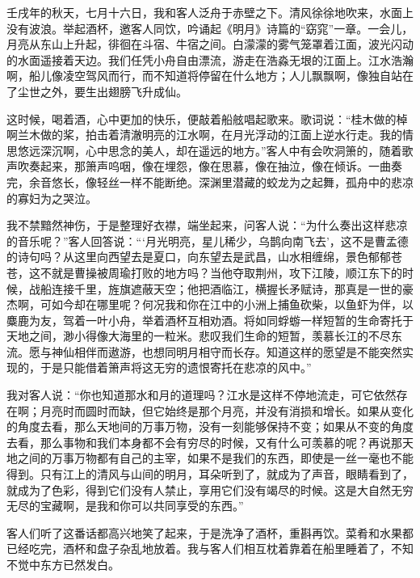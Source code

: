 \documentclass[12pt,UTF-8,openany,a4]{ctexbook}
\begin{document}
\begin{large}\yiwen
    
    壬戌年的秋天，七月十六日，我和客人泛舟于赤壁之下。清风徐徐地吹来，水面上没有波浪。举起酒杯，邀客人同饮，吟诵起《明月》诗篇的“窈窕”一章。一会儿，月亮从东山上升起，徘徊在斗宿、牛宿之间。白濛濛的雾气笼罩着江面，波光闪动的水面遥接着天边。我们任凭小舟自由漂流，游走在浩淼无垠的江面上。江水浩瀚啊，船儿像凌空驾风而行，而不知道将停留在什么地方；人儿飘飘啊，像独自站在了尘世之外，要生出翅膀飞升成仙。
    
    这时候，喝着酒，心中更加的快乐，便敲着船舷唱起歌来。歌词说：“桂木做的棹啊兰木做的桨，拍击着清澈明亮的江水啊，在月光浮动的江面上逆水行走。我的情思悠远深沉啊，心中思念的美人，却在遥远的地方。”客人中有会吹洞箫的，随着歌声吹奏起来，那箫声呜咽，像在埋怨，像在思慕，像在抽泣，像在倾诉。一曲奏完，余音悠长，像轻丝一样不能断绝。深渊里潜藏的蛟龙为之起舞，孤舟中的悲凉的寡妇为之哭泣。
    
    我不禁黯然神伤，于是整理好衣襟，端坐起来，问客人说：“为什么奏出这样悲凉的音乐呢？”客人回答说：“‘月光明亮，星儿稀少，乌鹊向南飞去’，这不是曹孟德的诗句吗？从这里向西望去是夏口，向东望去是武昌，山水相缠绵，景色郁郁苍苍，这不就是曹操被周瑜打败的地方吗？当他夺取荆州，攻下江陵，顺江东下的时候，战船连接千里，旌旗遮蔽天空；他把酒临江，横握长矛赋诗，那真是一世的豪杰啊，可如今却在哪里呢？何况我和你在江中的小洲上捕鱼砍柴，以鱼虾为伴，以麋鹿为友，驾着一叶小舟，举着酒杯互相劝酒。将如同蜉蝣一样短暂的生命寄托于天地之间，渺小得像大海里的一粒米。悲叹我们生命的短暂，羡慕长江的不尽东流。愿与神仙相伴而遨游，也想同明月相守而长存。知道这样的愿望是不能突然实现的，于是只能借着箫声将这无穷的遗恨寄托在悲凉的风中。”
    
    我对客人说：“你也知道那水和月的道理吗？江水是这样不停地流走，可它依然存在啊；月亮时而圆时而缺，但它始终是那个月亮，并没有消损和增长。如果从变化的角度去看，那么天地间的万事万物，没有一刻能够保持不变；如果从不变的角度去看，那么事物和我们本身都不会有穷尽的时候，又有什么可羡慕的呢？再说那天地之间的万事万物都有自己的主宰，如果不是我们的东西，即使是一丝一毫也不能得到。只有江上的清风与山间的明月，耳朵听到了，就成为了声音，眼睛看到了，就成为了色彩，得到它们没有人禁止，享用它们没有竭尽的时候。这是大自然无穷无尽的宝藏啊，是我和你可以共同享受的东西。”
    
    客人们听了这番话都高兴地笑了起来，于是洗净了酒杯，重斟再饮。菜肴和水果都已经吃完，酒杯和盘子杂乱地放着。我与客人们相互枕着靠着在船里睡着了，不知不觉中东方已然发白。
    

\end{large}
\end{document}
